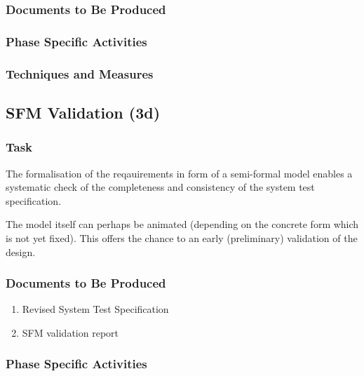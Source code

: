 \documentclass{template/openetcs_report}
\begin{document}
\subsubsection{Documents to Be Produced}
\label{sec:dasv-valid-docum-be-prod}


\subsubsection{Phase Specific Activities}
\label{sec:dasv-valid-phase-spec-activ}

\subsubsection{Techniques and Measures}
\label{sec:dasv-valid-techniques-measures}



\subsection{SFM Validation (3d)}
\label{sec:sfm-validation}

\subsubsection{Task}
\label{sec:sfm-valid-task}

The formalisation of the reqauirements in form of a semi-formal model
enables a systematic check of the completeness and consistency of the
system test specification.

The model itself can perhaps be animated (depending on the concrete
form which is not yet fixed). This offers the chance to an early
(preliminary) validation of the design.

\subsubsection{Documents to Be Produced}
\label{sec:sfm-valid-docum-be-prod}

\begin{enumerate}
\item Revised System Test Specification
\item SFM validation report
\end{enumerate}

\subsubsection{Phase Specific Activities}
\label{sec:sfm-valid-phase-spec-activ}
\end{document}
